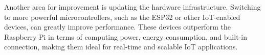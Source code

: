 \documentclass[a4paper,12pt]{report}
\begin{document}
Another area for improvement is updating the hardware infrastructure.  Switching to more powerful microcontrollers, such as the ESP32 or other IoT-enabled devices, can greatly improve performance.  These devices outperform the Raspberry Pi in terms of computing power, energy consumption, and built-in connection, making them ideal for real-time and scalable IoT applications.
 
 
 


\newpage
\renewcommand{\bibname}{References}



\end{document}
